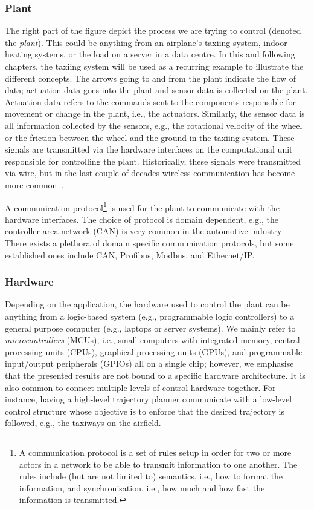 \subsubsection{Plant}%
%
The right part of the figure depict the process we are trying to control (denoted the \emph{plant}).
This could be anything from an airplane's taxiing system, indoor heating systems, or the load on a server in a data centre.
In this and following chapters, the taxiing system will be used as a recurring example to illustrate the different concepts.
The arrows going to and from the plant indicate the flow of data; actuation data goes into the plant and sensor data is collected on the plant.
Actuation data refers to the commands sent to the components responsible for movement or change in the plant, i.e., the actuators.
Similarly, the sensor data is all information collected by the sensors, e.g., the rotational velocity of the wheel or the friction between the wheel and the ground in the taxiing system.
These signals are transmitted via the hardware interfaces on the computational unit responsible for controlling the plant.
Historically, these signals were transmitted via wire, but in the last couple of decades wireless communication has become more common~\cite{Park:2018}.

A communication protocol\footnote{A communication protocol is a set of rules setup in order for two or more actors in a network to be able to transmit information to one another. The rules include (but are not limited to) semantics, i.e., how to format the information, and synchronisation, i.e., how much and how fast the information is transmitted.} is used for the plant to communicate with the hardware interfaces.
The choice of protocol is domain dependent, e.g., the controller area network (CAN) is very common in the automotive industry~\cite{Voss:2005}.
There exists a plethora of domain specific communication protocols, but some established ones include CAN, Profibus, Modbus, and Ethernet/IP.

\subsubsection{Hardware}%
%
Depending on the application, the hardware used to control the plant can be anything from a logic-based system (e.g., programmable logic controllers) to a general purpose computer (e.g., laptops or server systems).
We mainly refer to \emph{microcontrollers} (MCUs), i.e., small computers with integrated memory, central processing units (CPUs), graphical processing units (GPUs), and programmable input/output peripherals (GPIOs) all on a single chip; however, we emphasise that the presented results are not bound to a specific hardware architecture.
It is also common to connect multiple levels of control hardware together.
For instance, having a high-level trajectory planner communicate with a low-level control structure whose objective is to enforce that the desired trajectory is followed, e.g., the taxiways on the airfield.

